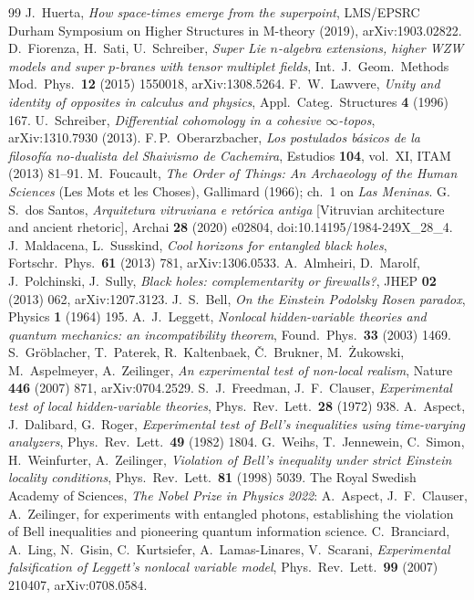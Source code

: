 \begin{thebibliography}{99}
 J.~Huerta, \emph{How space-times emerge from the superpoint}, LMS/EPSRC Durham Symposium on Higher Structures in M-theory (2019), arXiv:1903.02822.
 D.~Fiorenza, H.~Sati, U.~Schreiber, \emph{Super Lie $n$-algebra extensions, higher WZW models and super $p$-branes with tensor multiplet fields}, Int.\ J.\ Geom.\ Methods Mod.\ Phys.\ \textbf{12} (2015) 1550018, arXiv:1308.5264.
 F.~W.~Lawvere, \emph{Unity and identity of opposites in calculus and physics}, Appl.\ Categ.\ Structures \textbf{4} (1996) 167.
 U.~Schreiber, \emph{Differential cohomology in a cohesive $\infty$-topos}, arXiv:1310.7930 (2013).
 F.\,P.~Oberarzbacher, \emph{Los postulados b\'asicos de la filosof\'ia no-dualista del Shaivismo de Cachemira}, Estudios \textbf{104}, vol.~XI, ITAM (2013) 81--91.
 M.~Foucault, \emph{The Order of Things: An Archaeology of the Human Sciences} (Les Mots et les Choses), Gallimard (1966); ch.~1 on \emph{Las Meninas}.
 G.\,S.~dos Santos, \emph{Arquitetura vitruviana e ret\'orica antiga} [Vitruvian architecture and ancient rhetoric], Archai \textbf{28} (2020) e02804, doi:10.14195/1984-249X\_28\_4.
 J.~Maldacena, L.~Susskind, \emph{Cool horizons for entangled black holes}, Fortschr.\ Phys.\ \textbf{61} (2013) 781, arXiv:1306.0533.
 A.~Almheiri, D.~Marolf, J.~Polchinski, J.~Sully, \emph{Black holes: complementarity or firewalls?}, JHEP \textbf{02} (2013) 062, arXiv:1207.3123.
 J.~S.~Bell, \emph{On the Einstein Podolsky Rosen paradox}, Physics \textbf{1} (1964) 195.
 A.~J.~Leggett, \emph{Nonlocal hidden-variable theories and quantum mechanics: an incompatibility theorem}, Found.\ Phys.\ \textbf{33} (2003) 1469.
 S.~Gr\"oblacher, T.~Paterek, R.~Kaltenbaek, \v{C}.~Brukner, M.~\.{Z}ukowski, M.~Aspelmeyer, A.~Zeilinger, \emph{An experimental test of non-local realism}, Nature \textbf{446} (2007) 871, arXiv:0704.2529.
 S.~J.~Freedman, J.~F.~Clauser, \emph{Experimental test of local hidden-variable theories}, Phys.\ Rev.\ Lett.\ \textbf{28} (1972) 938.
 A.~Aspect, J.~Dalibard, G.~Roger, \emph{Experimental test of Bell's inequalities using time-varying analyzers}, Phys.\ Rev.\ Lett.\ \textbf{49} (1982) 1804.
 G.~Weihs, T.~Jennewein, C.~Simon, H.~Weinfurter, A.~Zeilinger, \emph{Violation of Bell's inequality under strict Einstein locality conditions}, Phys.\ Rev.\ Lett.\ \textbf{81} (1998) 5039.
 The Royal Swedish Academy of Sciences, \emph{The Nobel Prize in Physics 2022}: A.~Aspect, J.~F.~Clauser, A.~Zeilinger, for experiments with entangled photons, establishing the violation of Bell inequalities and pioneering quantum information science.
 C.~Branciard, A.~Ling, N.~Gisin, C.~Kurtsiefer, A.~Lamas-Linares, V.~Scarani, \emph{Experimental falsification of Leggett's nonlocal variable model}, Phys.\ Rev.\ Lett.\ \textbf{99} (2007) 210407, arXiv:0708.0584.
\end{thebibliography}

